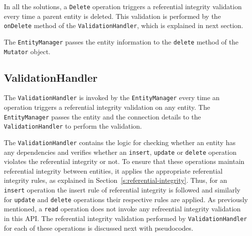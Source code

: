 		In all the solutions,  a \texttt{Delete} operation triggers a referential
		integrity validation every time a parent entity is deleted.  This validation
		is performed by the \texttt{onDelete} method of the
		\texttt{ValidationHandler}, which is explained in next section. 
		 
		 The 	\texttt{EntityManager} passes the entity information to the
		\texttt{delete} method of the \texttt{Mutator} object.
 		
		
		\subsection{ValidationHandler}\label{ss:VH}
		The \texttt{ValidationHandler} is invoked by the \texttt{EntityManager} every time
		an operation triggers a
		referential integrity validation on any entity. 
		The \texttt{EntityManager} passes the entity and the connection details  to
		the \texttt{ValidationHandler} to perform the validation.
		
		The \texttt{ValidationHandler} contains the  logic for checking whether an
		 entity has any dependencies and verifies whether an \texttt{insert},
		 \texttt{update} or \texttt{delete} operation  violates the referential
		integrity or not.  To ensure that these operations maintain referential
		 integrity between entities, it applies the appropriate referential integrity
		 rules, as explained in Section~\ref{s:referential-integrity}. Thus, for an
		 \texttt{insert} operation the insert rule of referential integrity is
		 followed and similarly for \texttt{update} and \texttt{delete} operations
		 their respective rules are applied. As previously mentioned, a \texttt{read}
		 operation does not invoke any refreential integrity validation in this
		 \ac{API}. The referential integrity validation performed by
		 \texttt{ValidationHandler} for each of these operations is discussed next
		with pseudocodes.
		
